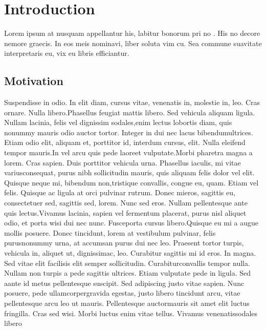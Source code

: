 \chapter{Introduction}
\label{ch:intro}
Lorem ipsum at nusquam appellantur his, labitur bonorum pri no \cite{nikWimob}. His no decore nemore graecis. In eos meis nominavi, liber soluta vim cu. Sea commune suavitate interpretaris eu, vix eu libris efficiantur.

%
%
\section{Motivation}
\label{sec:intro:motivation}
Suspendisse in odio. In elit diam, cursus vitae, venenatis in, molestie in, leo. Cras ornare. Nulla libero.Phasellus feugiat mattis libero. Sed vehicula aliquam ligula. Nullam lacinia, felis vel dignissim sodales,enim lectus lobortis diam, quis nonummy mauris odio auctor tortor. Integer in dui nec lacus bibendumultrices. Etiam odio elit, aliquam et, porttitor id, interdum cursus, elit. Nulla eleifend tempor mauris.In vel arcu quis pede laoreet vulputate.Morbi pharetra magna a lorem. Cras sapien. Duis porttitor vehicula urna. Phasellus iaculis, mi vitae variusconsequat, purus nibh sollicitudin mauris, quis aliquam felis dolor vel elit. Quisque neque mi, bibendum non,tristique convallis, congue eu, quam. Etiam vel felis. Quisque ac ligula at orci pulvinar rutrum. Donec mieros, sagittis eu, consectetuer sed, sagittis sed, lorem. Nunc sed eros. Nullam pellentesque ante quis lectus.Vivamus lacinia, sapien vel fermentum placerat, purus nisl aliquet odio, et porta wisi dui nec nunc. Fusceporta cursus libero.Quisque eu mi a augue mollis posuere. Donec tincidunt, lorem at vestibulum pulvinar, felis purusnonummy urna, at accumsan purus dui nec leo. Praesent tortor turpis, vehicula in, aliquet ut, dignissimac, leo. Curabitur sagittis mi id eros. In magna. Sed vitae elit facilisis elit semper sollicitudin. Curabiturconvallis tempor nulla. Nullam non turpis a pede sagittis ultrices. Etiam vulputate pede in ligula. Sed aante id metus pellentesque suscipit. Sed adipiscing justo vitae sapien. Nunc posuere, pede ullamcorpergravida egestas, justo libero tincidunt arcu, vitae pellentesque arcu leo ut mauris. Pellentesque auctormauris sit amet elit luctus fringilla. Cras sed wisi. Morbi luctus enim vitae tellus. Vivamus venenatissodales libero%
%
